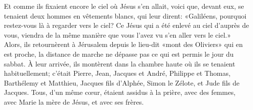 Et comme ils fixaient encore le ciel où Jésus s’en allait,
	voici que, devant eux, se tenaient deux hommes en vêtements blancs,
	qui leur dirent: «Galiléens, pourquoi restez-vous là à regarder vers le ciel?
	Ce Jésus qui a été enlevé au ciel d’auprès de vous,
	viendra de la même manière que vous l’avez vu s’en aller vers le ciel.»
Alors, ils retournèrent à Jérusalem
		depuis le lieu-dit «mont des Oliviers» qui en est proche,
	la distance de marche ne dépasse pas ce qui est permis le jour du sabbat.
À leur arrivée,
	ils montèrent dans la chambre haute où ils se tenaient habituellement;
	c’était Pierre, Jean, Jacques et André, Philippe et Thomas, Barthélemy et Matthieu,
	Jacques fils d’Alphée, Simon le Zélote, et Jude fils de Jacques.
Tous, d’un même cœur, étaient assidus à la prière,
	avec des femmes, avec Marie la mère de Jésus, et avec ses frères.
